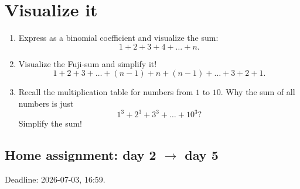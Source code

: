 \documentclass[12pt]{article}
\begin{document}
\section*{Visualize it}

\begin{exercise}
\begin{enumerate}[label=\alph*)]
\item Express as a binomial coefficient and visualize the sum:
\[
1 + 2 + 3 + 4 + \dots + n.
\]
\item Visualize the Fuji-sum and simplify it!
\[
1 + 2 + 3  + \dots + (n-1) + n + (n-1) + \dots + 3 + 2 + 1.
\]
\item Recall the multiplication table for numbers from $1$ to $10$.
Why the sum of all numbers is just 
\[
1^3 + 2^3 + 3^3 + \dots + 10^3?
\]
Simplify the sum!
\end{enumerate}

\end{exercise}

\subsection*{Home assignment: day 2 $\to$ day 5}

Deadline: 2026-07-03, 16:59. 
\end{document}
